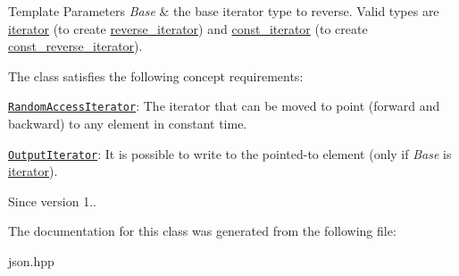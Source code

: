 \begin{DoxyTemplParams}{Template Parameters}
{\em Base} & the base iterator type to reverse. Valid types are \hyperlink{classnlohmann_1_1basic__json_a099316232c76c034030a38faa6e34dca}{iterator} (to create \hyperlink{classnlohmann_1_1basic__json_ac223d5560c2b05a208c88de67376c5f2}{reverse\+\_\+iterator}) and \hyperlink{classnlohmann_1_1basic__json_a41a70cf9993951836d129bb1c2b3126a}{const\+\_\+iterator} (to create \hyperlink{classnlohmann_1_1basic__json_a72be3c24bfa24f0993d6c11af03e7404}{const\+\_\+reverse\+\_\+iterator}).\\
\hline
\end{DoxyTemplParams}
The class satisfies the following concept requirements\+:
\begin{DoxyItemize}
\item \href{http://en.cppreference.com/w/cpp/concept/RandomAccessIterator}{\tt Random\+Access\+Iterator}\+: The iterator that can be moved to point (forward and backward) to any element in constant time.
\item \href{http://en.cppreference.com/w/cpp/concept/OutputIterator}{\tt Output\+Iterator}\+: It is possible to write to the pointed-\/to element (only if {\itshape Base} is \hyperlink{classnlohmann_1_1basic__json_a099316232c76c034030a38faa6e34dca}{iterator}).
\end{DoxyItemize}

\begin{DoxySince}{Since}
version 1.. 
\end{DoxySince}


The documentation for this class was generated from the following file\+:\begin{DoxyCompactItemize}
\item 
json.\+hpp\end{DoxyCompactItemize}

